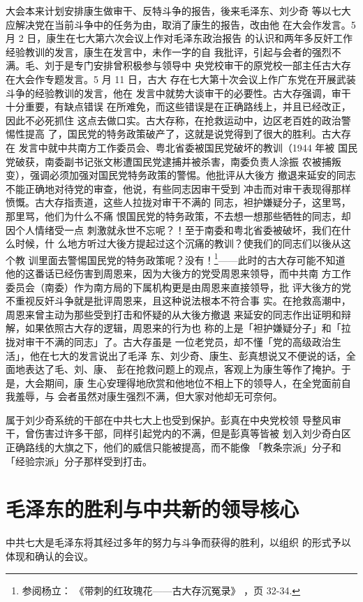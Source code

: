 大会本来计划安排康生做审干、反特斗争的报告，後来毛泽东、刘少奇
等以七大应解决党在当前斗争中的任务为由，取消了康生的报告，改由他
在大会作发言。5 月 2 日，康生在七大第六次会议上作对毛泽东政治报告
的认识和两年多反奸工作经验教训的发言，康生在发言中，未作一字的自
我批评，引起与会者的强烈不满。毛、刘于是专门安排曾积极参与领导中
央党校审干的原党校一部主任古大存在大会作专题发言。5 月 11 日，古大
存在七大第十次会议上作广东党在开展武装斗争的经验教训的发言，他在
发言中就势大谈审干的必要性。古大存强调，审干十分重要，有缺点错误
在所难免，而这些错误是在正确路线上，并且已经改正，因此不必死抓住
这点去做口实。古大存称，在抢救运动中，边区老百姓的政治警惕性提高
了，国民党的特务政策破产了，这就是说党得到了很大的胜利。古大存在
发言中就中共南方工作委员会、粤北省委被国民党破坏的教训（1944 年被
国民党破获，南委副书记张文彬遭国民党逮捕并被杀害，南委负责人涂振
农被捕叛变），强调必须加强对国民党特务政策的警惕。他批评从大後方
撤退来延安的同志不能正确地对待党的审查，他说，有些同志因审干受到
冲击而对审干表现得那样愤慨。古大存指责道，这些人拉拢对审干不满的
同志，袒护嫌疑分子，这里骂，那里骂，他们为什么不痛
恨国民党的特务政策，不去想一想那些牺牲的同志，却因个人情绪受一点
刺激就永世不忘呢？！至于南委和粤北省委被破坏，我们在什么时候，什
么地方听过大後方提起过这个沉痛的教训？使我们的同志们以後从这个教
训里面去警惕国民党的特务政策呢？没有！\footnote{参阅杨立：
《带刺的红玫瑰花——古大存沉冤录》
，页 32-34.}——此时的古大存可能不知道
他的这番话已经伤害到周恩来，因为大後方的党受周恩来领导，而中共南
方工作委员会（南委）作为南方局的下属机构更是由周恩来直接领导，批
评大後方的党不重视反奸斗争就是批评周恩来，且这种说法根本不符合事
实。在抢救高潮中，周恩来曾主动为那些受到打击和怀疑的从大後方撤退
来延安的同志作出证明和辩解，如果依照古大存的逻辑，周恩来的行为也
称的上是「袒护嫌疑分子」和「拉拢对审干不满的同志」了。古大存虽是
一位老党员，却不懂「党的高级政治生活」，他在七大的发言说出了毛泽
东、刘少奇、康生、彭真想说又不便说的话，全面地表达了毛、刘、康、
彭在抢救问题上的观点，客观上为康生等作了掩护。于是，大会期间，康
生心安理得地欣赏和他地位不相上下的领导人，在全党面前自我羞辱，与
会者虽然对康生强烈不满，但大家对他却无可奈何。

属于刘少奇系统的干部在中共七大上也受到保护。彭真在中央党校领
导整风审干，曾伤害过许多干部，同样引起党内的不满，但是彭真等皆被
划入刘少奇白区正确路线的大旗之下，他们的威信只能被提高，而不能像
「教条宗派」分子和「经验宗派」分子那样受到打击。

\section{毛泽东的胜利与中共新的领导核心}
中共七大是毛泽东将其经过多年的努力与斗争而获得的胜利，以组织
的形式予以体现和确认的会议。

